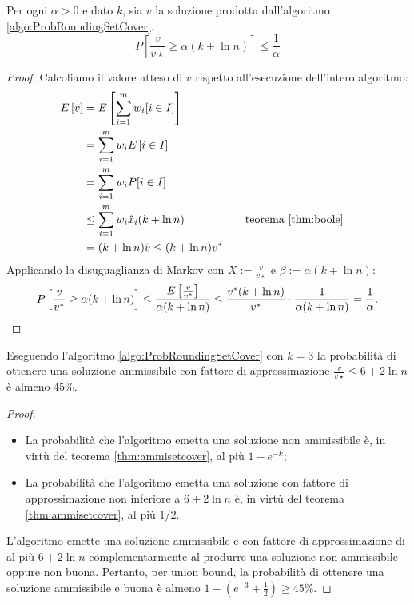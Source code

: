 \begin{theorem}\label{thm:ProbRoundingSetCoveralpha}
	Per ogni $\alpha>0$ e dato $k$, sia $v$ la soluzione prodotta dall'algoritmo \ref{algo:ProbRoundingSetCover}.
	\begin{equation*}
		P\left[\frac{v}{v\star}\geq\alpha(k+\ln n)\right] \leq \frac{1}{\alpha}
	\end{equation*}
\end{theorem}
\begin{proof}
	Calcoliamo il valore atteso di $v$ rispetto all'esecuzione dell'intero algoritmo:
	\begin{align*}
		E\left[v\right] & = E\left[\sum_{i=1}^m w_i [i\in I]\right]                                                  \\
		       & = \sum_{i=1}^m w_i E\left[i\in I\right]                                                    \\
		       & = \sum_{i=1}^m w_i P[i\in I]                                                      \\
		       & \leq \sum_{i=1}^m w_i \hat x_i(k+\ln n) &  & \quad \text{teorema \ref{thm:boole}} \\
		       & = (k+\ln n)\hat v \leq (k+\ln n)v^*
	\end{align*}
	Applicando la disuguaglianza di Markov con $X:=\frac{v}{v\star}$ e $\beta:=\alpha(k+\ln n)$:
	\begin{equation*}
		P\left[\frac{v}{v^*}\geq\alpha(k+\ln n)\right] \leq \frac{E\left[\frac{v}{v^*}\right]}{\alpha(k+\ln n)} \leq \frac{v^*(k+\ln n)}{v^*}\cdot\frac{1}{\alpha(k+\ln n)}=\frac{1}{\alpha} \text.
	\end{equation*}
\end{proof}

\begin{corollario}
	Eseguendo l'algoritmo \ref{algo:ProbRoundingSetCover} con $k=3$ la probabilità di ottenere una soluzione ammissibile con fattore di approssimazione $\frac{v}{v\star}\leq 6+2\ln n$ è almeno $45\%$.
\end{corollario}
\begin{proof}
	\begin{itemize}
		\item La probabilità che l'algoritmo emetta una soluzione non ammissibile è, in virtù del teorema \ref{thm:ammisetcover}, al più $1-e^{-k}$;
		\item La probabilità che l'algoritmo emetta una soluzione con fattore di approssimazione non inferiore a $6+2\ln n$ è, in virtù del teorema \ref{thm:ammisetcover}, al più $1/2$.
	\end{itemize}

	L'algoritmo emette una soluzione ammissibile e con fattore di approssimazione di al più $6+2\ln n$ complementarmente al produrre una soluzione non ammissibile oppure non buona.
	Pertanto, per union bound, la probabilità di ottenere una soluzione ammissibile e buona è almeno $1-(e^{-3}+\frac12)\geq 45\%$.
\end{proof}



